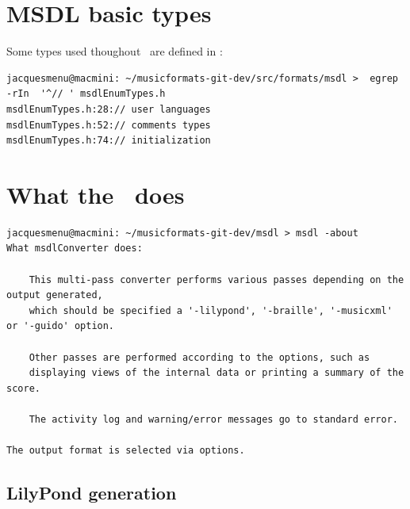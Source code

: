 \section{MSDL basic types}\label{MSDL basic types}

Some types used thoughout \msrRepr\ are defined in :%
\begin{lstlisting}[language=Terminal]
jacquesmenu@macmini: ~/musicformats-git-dev/src/formats/msdl >  egrep -rIn  '^// ' msdlEnumTypes.h
msdlEnumTypes.h:28:// user languages
msdlEnumTypes.h:52:// comments types
msdlEnumTypes.h:74:// initialization
\end{lstlisting}


\section{What the \msdLangConv\ does}

\begin{lstlisting}[language=Terminal]
jacquesmenu@macmini: ~/musicformats-git-dev/msdl > msdl -about
What msdlConverter does:

    This multi-pass converter performs various passes depending on the output generated,
    which should be specified a '-lilypond', '-braille', '-musicxml' or '-guido' option.

    Other passes are performed according to the options, such as
    displaying views of the internal data or printing a summary of the score.

    The activity log and warning/error messages go to standard error.

The output format is selected via options.
\end{lstlisting}

\subsection{LilyPond generation}

